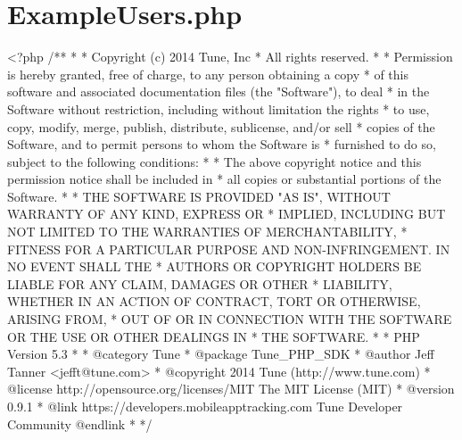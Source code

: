 \hypertarget{ExampleUsers_8php-example}{\section{Example\-Users.\-php}
}

\begin{DoxyCodeInclude}
<?php\textcolor{comment}{}
\textcolor{comment}{/**}
\textcolor{comment}{ *}
\textcolor{comment}{ * Copyright (c) 2014 Tune, Inc}
\textcolor{comment}{ * All rights reserved.}
\textcolor{comment}{ *}
\textcolor{comment}{ * Permission is hereby granted, free of charge, to any person obtaining a copy}
\textcolor{comment}{ * of this software and associated documentation files (the "Software"), to deal}
\textcolor{comment}{ * in the Software without restriction, including without limitation the rights}
\textcolor{comment}{ * to use, copy, modify, merge, publish, distribute, sublicense, and/or sell}
\textcolor{comment}{ * copies of the Software, and to permit persons to whom the Software is}
\textcolor{comment}{ * furnished to do so, subject to the following conditions:}
\textcolor{comment}{ *}
\textcolor{comment}{ * The above copyright notice and this permission notice shall be included in}
\textcolor{comment}{ * all copies or substantial portions of the Software.}
\textcolor{comment}{ *}
\textcolor{comment}{ * THE SOFTWARE IS PROVIDED "AS IS", WITHOUT WARRANTY OF ANY KIND, EXPRESS OR}
\textcolor{comment}{ * IMPLIED, INCLUDING BUT NOT LIMITED TO THE WARRANTIES OF MERCHANTABILITY,}
\textcolor{comment}{ * FITNESS FOR A PARTICULAR PURPOSE AND NON-INFRINGEMENT. IN NO EVENT SHALL THE}
\textcolor{comment}{ * AUTHORS OR COPYRIGHT HOLDERS BE LIABLE FOR ANY CLAIM, DAMAGES OR OTHER}
\textcolor{comment}{ * LIABILITY, WHETHER IN AN ACTION OF CONTRACT, TORT OR OTHERWISE, ARISING FROM,}
\textcolor{comment}{ * OUT OF OR IN CONNECTION WITH THE SOFTWARE OR THE USE OR OTHER DEALINGS IN}
\textcolor{comment}{ * THE SOFTWARE.}
\textcolor{comment}{ *}
\textcolor{comment}{ * PHP Version 5.3}
\textcolor{comment}{ *}
\textcolor{comment}{ * @category  Tune}
\textcolor{comment}{ * @package   Tune\_PHP\_SDK}
\textcolor{comment}{ * @author    Jeff Tanner <jefft@tune.com>}
\textcolor{comment}{ * @copyright 2014 Tune (http://www.tune.com)}
\textcolor{comment}{ * @license   http://opensource.org/licenses/MIT The MIT License (MIT)}
\textcolor{comment}{ * @version   0.9.1}
\textcolor{comment}{ * @link      https://developers.mobileapptracking.com Tune Developer Community @endlink}
\textcolor{comment}{ *}
\textcolor{comment}{ */}


\end{DoxyCodeInclude}
